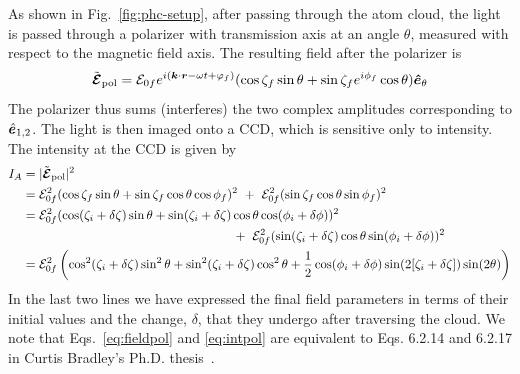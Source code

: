As shown in Fig.~\ref{fig:phc-setup},  after passing through the atom cloud, the
light is passed through a polarizer with transmission axis at an angle
$\theta$, measured with respect to the magnetic field axis. The resulting field
after the polarizer is 
\begin{equation}
  \tilde{\bm{\mathcal{E}}}_{\text{pol}} = 
     \mathcal{E}_{0f} e^{i(\bm{k}\cdot\bm{r} - \omega t + \varphi_{f} )} 
     ( \cos\zeta_{f}\sin\theta  
   +   \sin\zeta_{f} e^{i\phi_{f}} \cos\theta ) \bm{\hat{e}}_{\theta} 
\label{eq:fieldpol}
\end{equation}
The polarizer thus sums (interferes) the two complex amplitudes corresponding
to $\hat{\bm{e}}_{1,2}$.  The light is then imaged onto a CCD, which is
sensitive only to intensity.  The intensity
at the CCD is given by 
\begin{equation}
\begin{split}
  I_{A}  & = | \tilde{\bm{\mathcal{E}}}_{\text{pol} } |^{2}  \\
    & = \mathcal{E}_{0f}^{2}
        ( \cos\zeta_{f} \sin\theta 
             + \sin\zeta_{f} \cos\theta \cos\phi_{f} )^{2}
    ~+~ \mathcal{E}_{0f}^{2}(\sin\zeta_{f} \cos\theta \sin\phi_{f} )^{2} \\ 
    & = \mathcal{E}_{0f}^{2}
        ( \cos( \zeta_{i}+\delta\zeta) \sin\theta 
         + \sin( \zeta_{i} + \delta\zeta) 
           \cos\theta \cos(\phi_{i} + \delta\phi ))^{2} \\ 
    & ~~~~~~~~~~~~~~~~~~~~~~~~~~~~~~~~~~~~~~~~~~~~~~~~~~
      +~  \mathcal{E}_{0f}^{2}(\sin( \zeta_{i} +
          \delta\zeta) \cos\theta \sin( \phi_{i} + \delta\phi) )^{2} \\
    & = \mathcal{E}_{0f}^{2} 
       \left( \cos^{2}(\zeta_{i}+\delta\zeta) \sin^{2}\theta +  
              \sin^{2}(\zeta_{i}+\delta\zeta) \cos^{2}\theta +
         \frac{1}{2} \cos(\phi_{i}+\delta\phi) 
                     \sin(2[\zeta_{i}+\delta\zeta]) \sin(2\theta) \right)
\end{split}
\label{eq:intpol}
\end{equation}
In the last two lines we have expressed the final field parameters in terms of their
initial values and the change, $\delta$, that they undergo after traversing the
cloud.  We note that Eqs.~\ref{eq:fieldpol} and \ref{eq:intpol} are equivalent
to Eqs.  6.2.14 and 6.2.17  in  Curtis Bradley's Ph.D.
thesis~\cite{Bradley1996}. 



